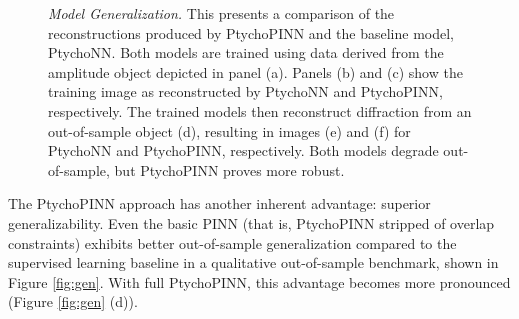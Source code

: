 \documentclass[sn-mathphys]{sn-jnl}%
\theoremstyle{thmstyleone}%
\theoremstyle{thmstyletwo}%
\theoremstyle{thmstylethree}%
\begin{document}
\begin{figure}
    \caption{\emph{Model Generalization.} This presents a comparison of the reconstructions produced by PtychoPINN and the baseline model, PtychoNN. Both models are trained using data derived from the amplitude object depicted in panel (a). Panels (b) and (c) show the training image as reconstructed by PtychoNN and PtychoPINN, respectively. The trained models then reconstruct diffraction from an out-of-sample object (d), resulting in images (e) and (f) for PtychoNN and PtychoPINN, respectively. Both models degrade out-of-sample, but PtychoPINN proves more robust. }%
    \label{fig:gen_detailed}%
\end{figure}

The PtychoPINN approach has another inherent advantage: superior generalizability. Even the basic PINN (that is, PtychoPINN stripped of overlap constraints) exhibits better out-of-sample generalization compared to the supervised learning baseline in a qualitative out-of-sample benchmark, shown in Figure \ref{fig:gen}. With full PtychoPINN, this advantage becomes more pronounced (Figure \ref{fig:gen} (d)). 


\end{document}
